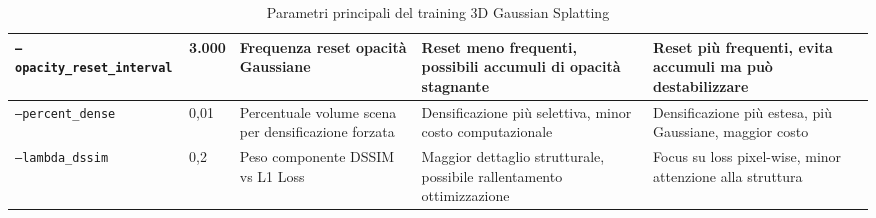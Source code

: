 \begin{sidewaystable}
\begin{tabular}{|p{3.9cm}|p{1.3cm}|p{3.8cm}|p{3.8cm}|p{3.8cm}|}
		\hline
		\texttt{--opacity\_reset\_interval} & 3.000 & Frequenza reset opacità Gaussiane & Reset meno frequenti, possibili accumuli di opacità stagnante & Reset più frequenti, evita accumuli ma può destabilizzare \\
		\hline
		\texttt{--percent\_dense} & 0,01 & Percentuale volume scena per densificazione forzata & Densificazione più selettiva, minor costo computazionale & Densificazione più estesa, più Gaussiane, maggior costo\\
		\hline
		\texttt{--lambda\_dssim} & 0,2 & Peso componente DSSIM vs L1 Loss & Maggior dettaglio strutturale, possibile rallentamento ottimizzazione & Focus su loss pixel-wise, minor attenzione alla struttura \\
		\hline
	\end{tabular}
	\caption{Parametri principali del training 3D Gaussian Splatting}
	\label{tab:3dgs_params}
\end{sidewaystable}

